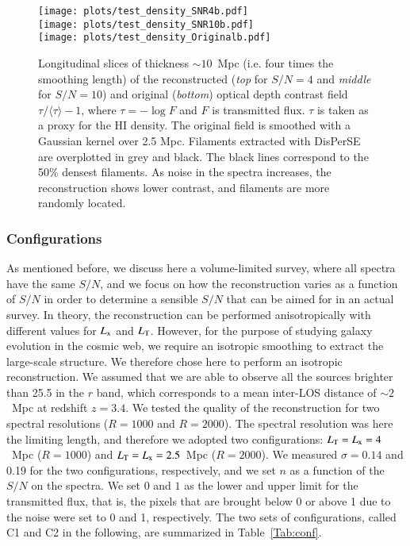 \documentclass{aa}
\begin{document}
\begin{figure*}
\begin{center}
\texttt{[image: plots/test\_density\_SNR4b.pdf]} \\
\vspace{0.2cm}
\texttt{[image: plots/test\_density\_SNR10b.pdf]} \\
\vspace{0.2cm}
\texttt{[image: plots/test\_density\_Originalb.pdf]} 
\caption{Longitudinal slices of  thickness $\sim 10$~Mpc (i.e. four times the smoothing length) of the reconstructed (\textit{top} for $S/N=4$ and \textit{middle} for $S/N=10$) and original (\textit{bottom}) optical depth contrast field $\tau/\langle \tau \rangle -1$, where $\tau = -\log F$ and $F$ is transmitted flux. $\tau$ is taken as a proxy for the HI density.
The original field is smoothed with a Gaussian kernel over 2.5 Mpc. Filaments extracted with {\sc DisPerSE} are overplotted in grey and black. The black lines correspond to the 50\% densest filaments. As noise in the spectra increases, the reconstruction shows lower contrast, and filaments are more randomly located. }
\label{fig09}
\end{center}
\end{figure*}

\subsubsection{Configurations}
\label{configuration}
As mentioned before, we discuss here a volume-limited survey, where all spectra have the same $S/N$, and we focus on how the reconstruction varies as a function of $S/N$ in order to determine a sensible $S/N$ that can be aimed for in an actual survey. In theory, the reconstruction can be performed anisotropically with different values for $L_{\rm x}$ and $L_{\rm T}$. However, for the purpose of studying galaxy evolution in the cosmic web, we require an isotropic smoothing to extract the large-scale structure. We therefore chose here to perform an isotropic reconstruction. We assumed that we are able to observe all the sources brighter than 25.5 in the $r$ band, which corresponds to a mean inter-LOS distance of $\sim 2$~Mpc at redshift $z = 3.4$. We tested the quality of the reconstruction for two spectral resolutions ($R=1000$ and $R=2000$). The spectral resolution was here the limiting length, and therefore we adopted two configurations: $L_{\rm T}=L_{\rm x}=4$~Mpc ($R=1000$) and $L_{\rm T}=L_{\rm x}=2.5$~Mpc ($R=2000$). We measured $\sigma= 0.14$ and 0.19 for the two configurations, respectively, and we set $n$ as a function of the $S/N$ on the spectra. We set $0$ and $1$ as the lower and upper limit for the transmitted flux, that is, the pixels that are brought below 0 or above 1 due to the noise were set to 0 and 1, respectively. The two sets of configurations, called C1 and C2 in the following, are summarized in Table~\ref{Tab:conf}.
\end{document}
